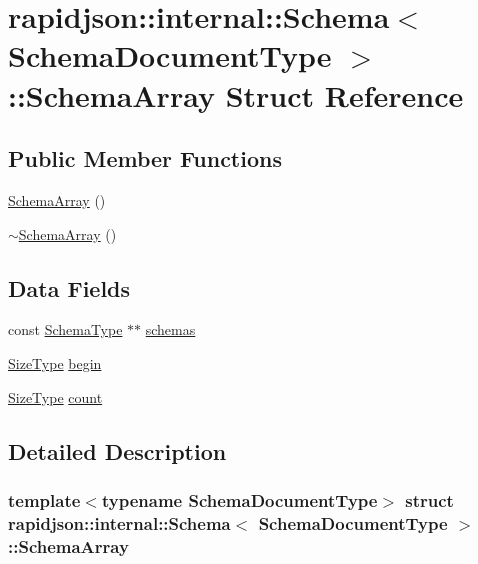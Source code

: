 \hypertarget{structrapidjson_1_1internal_1_1_schema_1_1_schema_array}{}\section{rapidjson\+::internal\+::Schema$<$ Schema\+Document\+Type $>$\+::Schema\+Array Struct Reference}
\label{structrapidjson_1_1internal_1_1_schema_1_1_schema_array}
\subsection*{Public Member Functions}
\begin{DoxyCompactItemize}
\item 
\mbox{\hyperlink{structrapidjson_1_1internal_1_1_schema_1_1_schema_array_a814d5f4281e35bba5c5289254dd3162b}{Schema\+Array}} ()
\item 
\mbox{\hyperlink{structrapidjson_1_1internal_1_1_schema_1_1_schema_array_ae55ee3532d70fbb7b495813a831c2178}{$\sim$\+Schema\+Array}} ()
\end{DoxyCompactItemize}
\subsection*{Data Fields}
\begin{DoxyCompactItemize}
\item 
const \mbox{\hyperlink{classrapidjson_1_1internal_1_1_schema_a62e03be17971648a9d614244ffcb0f10}{Schema\+Type}} $\ast$$\ast$ \mbox{\hyperlink{structrapidjson_1_1internal_1_1_schema_1_1_schema_array_a7dbfb5fabd5ac32573172d2295be7012}{schemas}}
\item 
\mbox{\hyperlink{namespacerapidjson_a44eb33eaa523e36d466b1ced64b85c84}{Size\+Type}} \mbox{\hyperlink{structrapidjson_1_1internal_1_1_schema_1_1_schema_array_a8cd7516e77f1c26ad90d5e876c4de3b4}{begin}}
\item 
\mbox{\hyperlink{namespacerapidjson_a44eb33eaa523e36d466b1ced64b85c84}{Size\+Type}} \mbox{\hyperlink{structrapidjson_1_1internal_1_1_schema_1_1_schema_array_aab9d520fb9a18f44ecc9672778768dfe}{count}}
\end{DoxyCompactItemize}


\subsection{Detailed Description}
\subsubsection*{template$<$typename Schema\+Document\+Type$>$\newline
struct rapidjson\+::internal\+::\+Schema$<$ Schema\+Document\+Type $>$\+::\+Schema\+Array}



